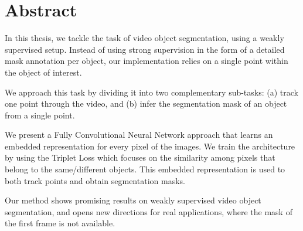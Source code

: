 
\chapter*{Abstract}
\label{cha:abstract}

In this thesis, we tackle the task of video object segmentation, using a weakly supervised setup.
Instead of using strong supervision in the form of a detailed mask annotation per object, our implementation relies on a single point within the object of interest.

We approach this task by dividing it into two complementary sub-tasks: 
(a) track one point through the video,
and (b) infer the segmentation mask of an object from a single point.

We present a Fully Convolutional Neural Network approach that learns an embedded representation for every pixel of the images.
We train the architecture by using the Triplet Loss which focuses on the similarity among pixels that belong to the same/different objects.
This embedded representation is used to both track points and obtain segmentation masks.

Our method shows promising results on weakly supervised video object segmentation, and opens new directions for real applications, where the mask of the first frame is not available.
